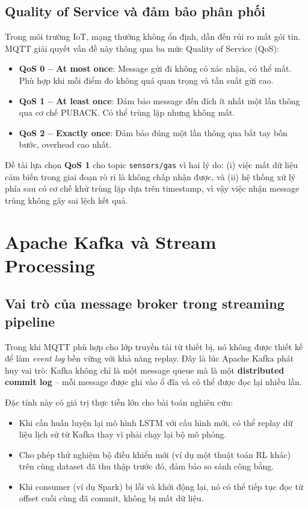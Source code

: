 \subsection{Quality of Service và đảm bảo phân phối}

Trong môi trường IoT, mạng thường không ổn định, dẫn đến rủi ro mất gói tin. MQTT giải quyết vấn đề này thông qua ba mức Quality of Service (QoS):

\begin{itemize}
  \item \textbf{QoS 0 – At most once}: Message gửi đi không có xác nhận, có thể mất. Phù hợp khi mỗi điểm đo không quá quan trọng và tần suất gửi cao.
  \item \textbf{QoS 1 – At least once}: Đảm bảo message đến đích ít nhất một lần thông qua cơ chế PUBACK. Có thể trùng lặp nhưng không mất.
  \item \textbf{QoS 2 – Exactly once}: Đảm bảo đúng một lần thông qua bắt tay bốn bước, overhead cao nhất.
\end{itemize}

Đề tài lựa chọn \textbf{QoS 1} cho topic \texttt{sensors/gas} vì hai lý do: (i) việc mất dữ liệu cảm biến trong giai đoạn rò rỉ là không chấp nhận được, và (ii) hệ thống xử lý phía sau có cơ chế khử trùng lặp dựa trên timestamp, vì vậy việc nhận message trùng không gây sai lệch kết quả.

\section{Apache Kafka và Stream Processing}

\subsection{Vai trò của message broker trong streaming pipeline}

Trong khi MQTT phù hợp cho lớp truyền tải từ thiết bị, nó không được thiết kế để làm \textit{event log} bền vững với khả năng replay. Đây là lúc Apache Kafka phát huy vai trò: Kafka không chỉ là một message queue mà là một \textbf{distributed commit log} – mỗi message được ghi vào ổ đĩa và có thể được đọc lại nhiều lần.

Đặc tính này có giá trị thực tiễn lớn cho bài toán nghiên cứu:
\begin{itemize}
  \item Khi cần huấn luyện lại mô hình LSTM với cấu hình mới, có thể replay dữ liệu lịch sử từ Kafka thay vì phải chạy lại bộ mô phỏng.
  \item Cho phép thử nghiệm bộ điều khiển mới (ví dụ một thuật toán RL khác) trên cùng dataset đã thu thập trước đó, đảm bảo so sánh công bằng.
  \item Khi consumer (ví dụ Spark) bị lỗi và khởi động lại, nó có thể tiếp tục đọc từ offset cuối cùng đã commit, không bị mất dữ liệu.
\end{itemize}


